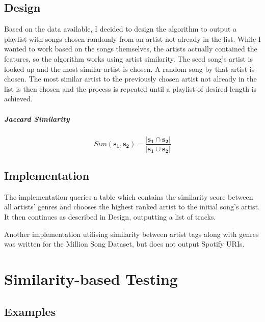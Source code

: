 \documentclass[a4paper, 12pt]{report}
\begin{document}
\section{Design}
Based on the data available, I decided to design the algorithm to output a playlist with songs chosen randomly from an artist not already in the list.
While I wanted to work based on the songs themselves, the artists actually contained the features, so the algorithm works using artist similarity.
The seed song's artist is looked up and the most similar artist is chosen. A random song by that artist is chosen.
The most similar artist to the previously chosen artist not already in the list is then chosen and the process is repeated until a playlist of desired length is achieved.

\paragraph{Jaccard Similarity}
\[Sim(\bm{s_1}, \bm{s_2}) = \frac{|\bm{s_1} \cap \bm{s_2}|}{|\bm{s_1} \cup \bm{s_2}|}\]

\section{Implementation}
The implementation queries a table which contains the similarity score between all artists' genres and chooses the highest ranked artist to the initial song's artist.
It then continues as described in Design, outputting a list of tracks.

Another implementation utilising similarity between artist tags along with genres was written for the Million Song Dataset, but does not output Spotify URIs.



\chapter{Similarity-based Testing}

\section{Examples}
\preto\tabular{\setcounter{magicrownumbers}{0}}
\newcommand\rownumber{\stepcounter{magicrownumbers}\arabic{magicrownumbers}}
\end{document}

